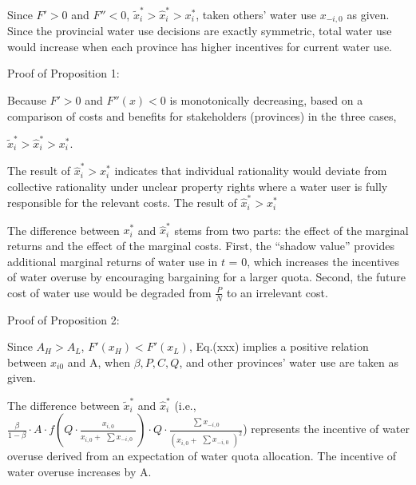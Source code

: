 \documentclass[preprint, 12pt]{elsarticle}
\begin{document}
Since $F'>0$ and $F''<0$, $\widetilde x_i^*>\hat x_i^*>x_i^*$, taken others' water use $x_{-i,0}$ as given. Since the provincial water use decisions are exactly symmetric, total water use would increase when each province has higher incentives for current water use.

Proof of Proposition 1:

Because $F'>0$ and $F''(x)<0$ is monotonically decreasing, based on a comparison of costs and benefits for stakeholders (provinces) in the three cases,

$\widetilde x_i^*>\hat x_i^*>x_i^*$.

The result of $\hat x_i^*>x_i^*$ indicates that individual rationality would deviate from collective rationality under unclear property rights where a water user is fully responsible for the relevant costs. The result of $\hat x_i^*>x_i^*$

The difference between $ x_i^*$ and $\hat x_i^*$ stems from two parts: the effect of the marginal returns and the effect of the marginal costs. First, the ``shadow value'' provides additional marginal returns of water use in $t$ = 0, which increases the incentives of water overuse by encouraging bargaining for a larger quota. Second, the future cost of water use would be degraded from $\frac{P}{N}$ to an irrelevant cost.

Proof of Proposition 2:

Since $A_H>A_L$, $F'(x_H)<F'(x_L)$,
Eq.(xxx) implies a positive relation between $x_{i0}$ and A, when $\beta, P, C, Q$, and other provinces' water use are taken as given.

The difference between $\widetilde x_i^*$ and $\hat x_i^*$ (i.e., $\frac{\beta}{1-\beta} \cdot A \cdot f(Q \cdot \frac{x_{i,0}}{x_{i,0} + \begin{matrix} \sum x_{-i,0} \end{matrix}}) \cdot Q \cdot \frac{\begin{matrix} \sum x_{-i,0} \end{matrix}}{(x_{i,0} + \begin{matrix} \sum x_{-i,0} \end{matrix})^2}$) represents the incentive of water overuse derived from an expectation of water quota allocation. The incentive of water overuse increases by A.
\end{document}

